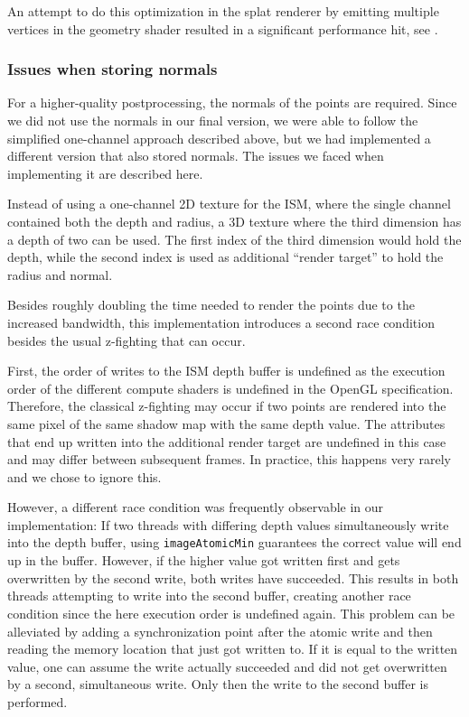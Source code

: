 
An attempt to do this optimization in the splat renderer by emitting multiple vertices in the geometry shader resulted in a significant performance hit, see .


\subsubsection{Issues when storing normals}
\label{sec:impl:raceCondition}

For a higher-quality postprocessing, the normals of the points are required. Since we did not use the normals in our final version, we were able to follow the simplified one-channel approach described above, but we had implemented a different version that also stored normals. The issues we faced when implementing it are described here.

Instead of using a one-channel 2D texture for the ISM, where the single channel contained both the depth and radius, a 3D texture where the third dimension has a depth of two can be used. The first index of the third dimension would hold the depth, while the second index is used as additional ``render target'' to hold the radius and normal.

Besides roughly doubling the time needed to render the points due to the increased bandwidth, this implementation introduces a second race condition besides the usual z-fighting that can occur.

First, the order of writes to the ISM depth buffer is undefined as the execution order of the different compute shaders is undefined in the OpenGL specification. Therefore, the classical z-fighting may occur if two points are rendered into the same pixel of the same shadow map with the same depth value. The attributes that end up written into the additional render target are undefined in this case and may differ between subsequent frames. In practice, this happens very rarely and we chose to ignore this.

However, a different race condition was frequently observable in our implementation:
If two threads with differing depth values simultaneously write into the depth buffer, using \texttt{imageAtomicMin} guarantees the correct value will end up in the buffer. However, if the higher value got written first and gets overwritten by the second write, both writes have succeeded. This results in both threads attempting to write into the second buffer, creating another race condition since the here execution order is undefined again. This problem can be alleviated by adding a synchronization point after the atomic write and then reading the memory location that just got written to. If it is equal to the written value, one can assume the write actually succeeded and did not get overwritten by a second, simultaneous write. Only then the write to the second buffer is performed.

